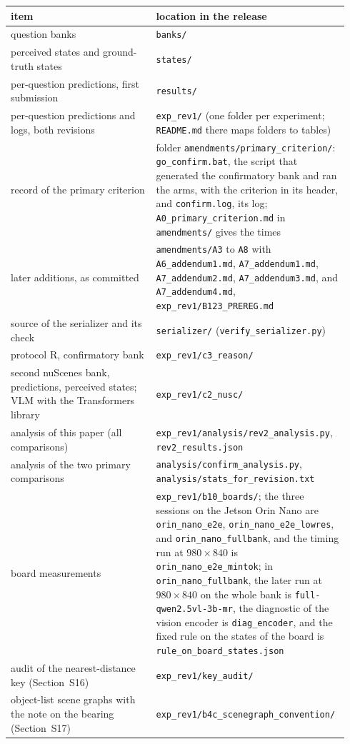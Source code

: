 \documentclass[10pt]{article}
\begin{document}
\medskip
\begin{tabular}{@{}p{0.42\linewidth}p{0.52\linewidth}@{}}
\toprule item & location in the release \\ \midrule
question banks & \texttt{banks/} \\
perceived states and ground-truth states & \texttt{states/} \\
per-question predictions, first submission & \texttt{results/} \\
per-question predictions and logs, both revisions & \texttt{exp\_rev1/} (one folder per experiment; \texttt{README.md} there maps folders to tables) \\
record of the primary criterion & folder \texttt{amendments/primary\_criterion/}: \texttt{go\_confirm.bat}, the script that generated the confirmatory bank and ran the arms, with the criterion in its header, and \texttt{confirm.log}, its log; \texttt{A0\_primary\_criterion.md} in \texttt{amendments/} gives the times \\
later additions, as committed & \texttt{amendments/A3} to \texttt{A8} with \texttt{A6\_addendum1.md}, \texttt{A7\_addendum1.md}, \texttt{A7\_addendum2.md}, \texttt{A7\_addendum3.md}, and \texttt{A7\_addendum4.md}, \texttt{exp\_rev1/B123\_PREREG.md} \\
source of the serializer and its check & \texttt{serializer/} (\texttt{verify\_serializer.py}) \\
protocol R, confirmatory bank & \texttt{exp\_rev1/c3\_reason/} \\
second nuScenes bank, predictions, perceived states; VLM with the Transformers library & \texttt{exp\_rev1/c2\_nusc/} \\
analysis of this paper (all comparisons) & \texttt{exp\_rev1/analysis/rev2\_analysis.py}, \texttt{rev2\_results.json} \\
analysis of the two primary comparisons & \texttt{analysis/confirm\_analysis.py}, \texttt{analysis/stats\_for\_revision.txt} \\
board measurements & \texttt{exp\_rev1/b10\_boards/}; the three sessions on the Jetson Orin Nano are \texttt{orin\_nano\_e2e}, \texttt{orin\_nano\_e2e\_lowres}, and \texttt{orin\_nano\_fullbank}, and the timing run at $980\times840$ is \texttt{orin\_nano\_e2e\_mintok}; in \texttt{orin\_nano\_fullbank}, the later run at $980\times840$ on the whole bank is \texttt{full-qwen2.5vl-3b-mr}, the diagnostic of the vision encoder is \texttt{diag\_encoder}, and the fixed rule on the states of the board is \texttt{rule\_on\_board\_states.json} \\
audit of the nearest-distance key (Section~S16) & \texttt{exp\_rev1/key\_audit/} \\
object-list scene graphs with the note on the bearing (Section~S17) & \texttt{exp\_rev1/b4c\_scenegraph\_convention/} \\
\bottomrule
\end{tabular}
\end{document}
